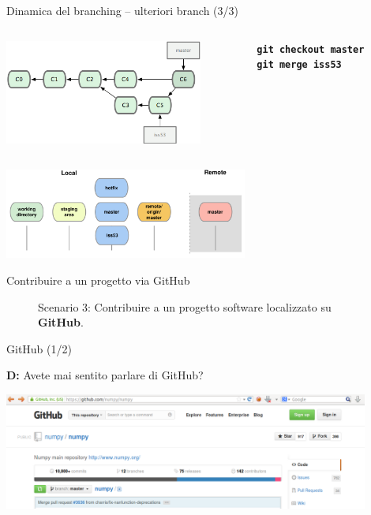 \documentclass{beamer}
\begin{document}
\begin{frame}{\centerline{Dinamica del branching -- ulteriori branch (3/3)}}
  \begin{columns}
    \begin{column}{0.6\linewidth}
      \begin{center}
        \includegraphics[width=6.5cm]{A2023.LavoroCondiviso/18333fig0317-tn}
      \end{center}
    \end{column}
    \begin{column}{0.45\linewidth}
      \begin{center}
        \texttt{\textbf{git checkout master}}\\
        \texttt{\textbf{git merge iss53}}
      \end{center}
    \end{column}
  \end{columns}
  \begin{center}
    \includegraphics[width=8cm]{A2023.LavoroCondiviso/git-branch2}
  \end{center}
\end{frame}


\begin{frame}{\centerline{Contribuire a un progetto via GitHub}}
  \begin{figure}
    \centering
    Scenario 3: Contribuire a un progetto software localizzato su
    \textbf{GitHub}.
  \end{figure}
\end{frame}

\begin{frame}{\centerline{GitHub (1/2)}}
  \textbf{D:} Avete mai sentito parlare di GitHub?
  \begin{center}
      
  \includegraphics[width=12cm]{A2023.LavoroCondiviso/github}
    \end{center}

\end{frame}
\end{document}
